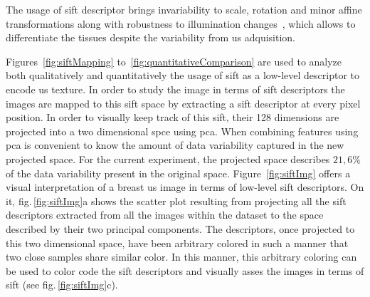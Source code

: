 \documentclass[a4paper, 10pt, conference]{llncs}      %
\begin{document}

The usage of \ac{sift} descriptor brings invariability to scale, rotation and minor affine transformations along with robustness to illumination changes~\cite{lowe2004distinctive}, which allows to differentiate the tissues despite the variability from \ac{us} adquisition.



Figures~\ref{fig:siftMapping} to~\ref{fig:quantitativeComparison} are used to analyze both qualitatively and quantitatively the usage of \ac{sift} as a low-level descriptor to encode \ac{us} texture. In order to study the image in terms of \ac{sift} descriptors the images are mapped to this \ac{sift} space by extracting a \ac{sift} descriptor at every pixel position. In order to visually keep track of this \ac{sift}, their 128 dimensions are projected into a two dimensional spce using \ac{pca}. When combining features using \ac{pca} is convenient to know the amount of data variability captured in the new projected space. For the current experiment, the projected space describes $21,6\%$ of the data variability present in the original space. 
Figure~\ref{fig:siftImg} offers a visual interpretation of a breast \ac{us} image in terms of low-level \ac{sift} descriptors. On it, fig.\,\ref{fig:siftImg}a shows the scatter plot resulting from projecting all the \ac{sift} descriptors extracted from all the images within the dataset to the space described by their two principal components.
The descriptors, once projected to this two dimensional space, have 
been arbitrary colored in such a manner that two close samples share similar color. In this manner, this arbitrary coloring can be used to color code the \ac{sift} descriptors and visually asses the images in terms of \ac{sift} (see fig.\,\ref{fig:siftImg}c).
\end{document}
